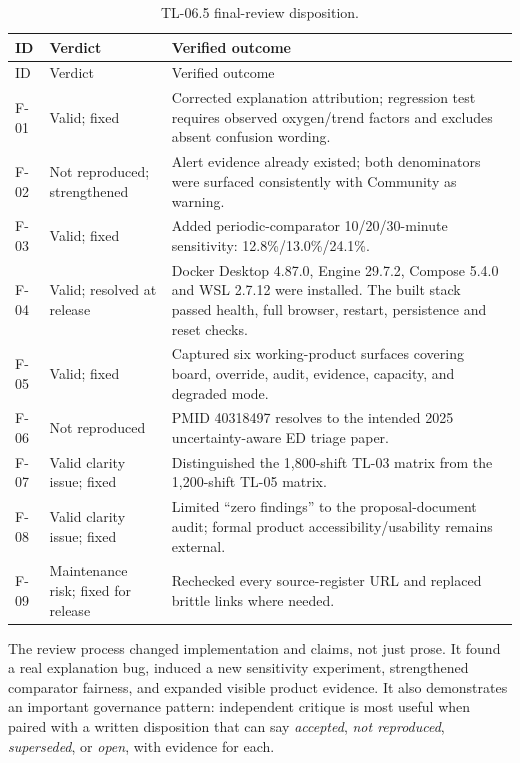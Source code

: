 \documentclass[11pt,a4paper]{article}
\begin{document}
\begin{longtable}{@{}L{19mm}L{37mm}L{94mm}@{}}
\caption{TL-06.5 final-review disposition.}\label{tab:review2}\\
\toprule
ID & Verdict & Verified outcome \\
\midrule
\endfirsthead
\toprule
ID & Verdict & Verified outcome \\
\midrule
\endhead
F-01 & Valid; fixed & Corrected explanation attribution; regression test requires observed oxygen/trend factors and excludes absent confusion wording. \\
F-02 & Not reproduced; strengthened & Alert evidence already existed; both denominators were surfaced consistently with Community as warning. \\
F-03 & Valid; fixed & Added periodic-comparator 10/20/30-minute sensitivity: 12.8\%/13.0\%/24.1\%. \\
F-04 & Valid; resolved at release & Docker Desktop 4.87.0, Engine 29.7.2, Compose 5.4.0 and WSL 2.7.12 were installed. The built stack passed health, full browser, restart, persistence and reset checks. \\
F-05 & Valid; fixed & Captured six working-product surfaces covering board, override, audit, evidence, capacity, and degraded mode. \\
F-06 & Not reproduced & PMID 40318497 resolves to the intended 2025 uncertainty-aware ED triage paper. \\
F-07 & Valid clarity issue; fixed & Distinguished the 1,800-shift TL-03 matrix from the 1,200-shift TL-05 matrix. \\
F-08 & Valid clarity issue; fixed & Limited ``zero findings'' to the proposal-document audit; formal product accessibility/usability remains external. \\
F-09 & Maintenance risk; fixed for release & Rechecked every source-register URL and replaced brittle links where needed. \\
\bottomrule
\end{longtable}

The review process changed implementation and claims, not just prose. It found a real explanation bug, induced a new sensitivity experiment, strengthened comparator fairness, and expanded visible product evidence. It also demonstrates an important governance pattern: independent critique is most useful when paired with a written disposition that can say \emph{accepted}, \emph{not reproduced}, \emph{superseded}, or \emph{open}, with evidence for each.
\end{document}
